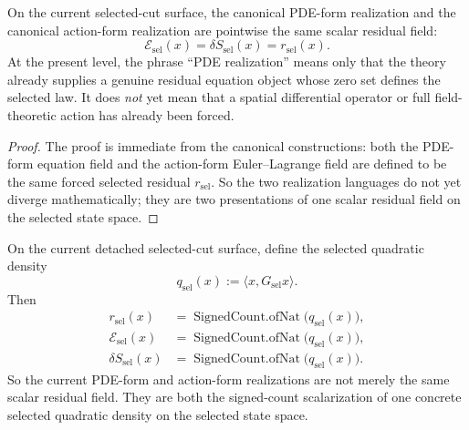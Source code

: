 \begin{theorem}
\label{thm:the-current-pde-form-and-action-form-realizations-are-the-same-scalar-residual-field}
On the current selected-cut surface, the canonical PDE-form
realization and the canonical action-form realization are pointwise the same
scalar residual field:
\[
\mathcal{E}_{\mathrm{sel}}(x)=\delta S_{\mathrm{sel}}(x)=r_{\mathrm{sel}}(x).
\]
At the present level, the phrase ``PDE realization'' means only that
the theory already supplies a genuine residual equation object whose zero set
defines the selected law. It does \emph{not} yet mean that a spatial
differential operator or full field-theoretic action has already been forced.
\end{theorem}

\begin{proof}
The proof is immediate from the canonical constructions: both the PDE-form
equation field and the action-form Euler--Lagrange field are defined to be the
same forced selected residual \(r_{\mathrm{sel}}\). So the two realization
languages do not yet diverge mathematically; they are two presentations of one
scalar residual field on the selected state space.
\end{proof}

\begin{theorem}
\label{thm:the-current-scalar-realizations-come-from-one-selected-quadratic-density}
On the current detached selected-cut surface, define the selected quadratic
density
\[
q_{\mathrm{sel}}(x):=\langle x,G_{\mathrm{sel}}x\rangle.
\]
Then
\[
\begin{aligned}
r_{\mathrm{sel}}(x)
  &=\operatorname{SignedCount.ofNat}\!\bigl(q_{\mathrm{sel}}(x)\bigr),\\
\mathcal{E}_{\mathrm{sel}}(x)
  &=\operatorname{SignedCount.ofNat}\!\bigl(q_{\mathrm{sel}}(x)\bigr),\\
\delta S_{\mathrm{sel}}(x)
  &=\operatorname{SignedCount.ofNat}\!\bigl(q_{\mathrm{sel}}(x)\bigr).
\end{aligned}
\]
So the current PDE-form and action-form realizations are not merely the same
scalar residual field. They are both the signed-count scalarization of one
concrete selected quadratic density on the selected state space.
\end{theorem}


